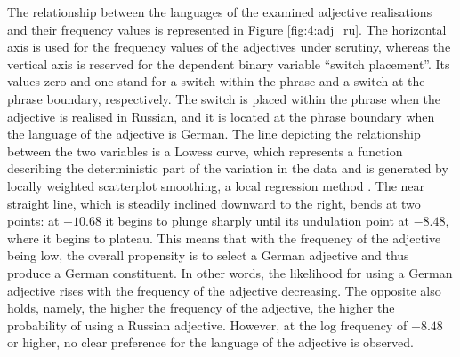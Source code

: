 The relationship between the languages of the examined adjective realisations and their frequency values is represented in Figure \ref{fig:4:adj_ru}. The horizontal axis is used for the frequency values of the adjectives under scrutiny, whereas the vertical axis is reserved for the dependent binary variable “switch placement”. Its values zero and one stand for a switch within the phrase and a switch at the phrase boundary, respectively. The switch is placed within the phrase when the adjective is realised in Russian, and it is located at the phrase boundary when the language of the adjective is German. The line depicting the relationship between the two variables is a Lowess curve, which represents a function describing the deterministic part of the variation in the data and is generated by locally weighted scatterplot smoothing, a local regression method \citep{lowess}. The near straight line, which is steadily inclined downward to the right, bends at two points: at $-10.68$ it begins to plunge sharply until its undulation point at $-8.48$, where it begins to plateau. This means that with the frequency of the adjective being low, the overall propensity is to select a German adjective and thus produce a German constituent. In other words, the likelihood for using a German adjective rises with the frequency of the adjective decreasing. The opposite also holds, namely, the higher the frequency of the adjective, the higher the probability of using a Russian adjective. However, at the log frequency of $-8.48$ or higher, no clear preference for the language of the adjective is observed.

